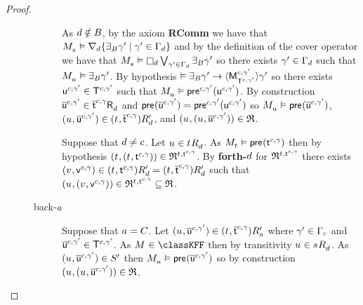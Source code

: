 \begin{proof}
\begin{description}
\begin{description}
                As $\agentD \notin \agentsB$, by the \axiomAamlKFF{} axiom {\bf RComm} we have that $\kPModel{\kStateS} \entails \coversD \{\someactsBs \gamma' \mid \gamma' \in \Gamma_\agentD\}$ and by the definition of the cover operator we have that $\kPModel{\kStateS} \entails \necessaryD \bigvee_{\gamma' \in \Gamma_\agentD} \someactsBs \gamma'$ so there exists $\gamma' \in \Gamma_\agentD$ such that $\kPModel{\kStateU} \entails \someactsBs \gamma'$.
                By hypothesis $\entails \someactsBs \gamma' \implies \actionE{\aPModel[\agentC, \gamma']{\aStatesT[\agentC, \gamma']}} \gamma'$ so there exists $\aStateU[\agentC, \gamma'] \in \aStatesT[\agentC, \gamma']$ such that $\kPModel{\kStateU} \entails \aPrecondition[\agentC, \gamma'](\aStateU[\agentC, \gamma'])$.
                By construction $\aPStateU[\agentC, \gamma'] \in \aSuccessorsD{\aPStateT[\agentC, \gamma]}$ and $\aPrecondition(\aPStateU[\agentC, \gamma']) = \aPrecondition[\agentC, \gamma'](\aStateU[\agentC, \gamma'])$ so $\kPModel{\kStateU} \entails \aPrecondition(\aPStateU[\agentC, \gamma'])$, $(\kStateU, \aPStateU[\agentC, \gamma']) \in \kSuccessorsPD{(\kStateT, \aPStateT[\agentC, \gamma])}$, and $(\kStateU, (\kStateU, \aPStateU[\agentC, \gamma'])) \in \refinement$.

                Suppose that $\agentD \neq \agentC$.
                Let $\kStateU \in \kSuccessorsD{\kStateT}$.
                As $\kPModel{\kStateT} \entails \aPrecondition(\aStateT[\agentC, \gamma])$ then by hypothesis $(\kStateT, (\kStateT, \aStateT[\agentC, \gamma])) \in \refinement^{\kStateT, \aStateT[\agentC, \gamma]}$.
                By {\bf forth-$\agentD$} for $\refinement^{\kStateT, \aStateT[\agentC, \gamma]}$ there exists $(\kStateV, \aStateV[\agentC, \gamma]) \in \kSuccessorsPD{(\kStateT, \aStateT[\agentC, \gamma])} = \kSuccessorsPD{(\kStateT, \aPStateT[\agentC, \gamma])}$ such that $(\kStateU, (\kStateV, \aStateV[\agentC, \gamma])) \in \refinement^{\kStateT, \aStateT[\agentC, \gamma]} \subseteq \refinement$.
            \item[back-$\agentA$]
                Suppose that $\agentA = \agentsC$.
                Let $(\kStateU, \aPStateU[\agentC, \gamma']) \in \kSuccessorsPA{(\kStateT, \aPStateT[\agentC, \gamma])}$ where $\gamma' \in \Gamma_\agentC$ and $\aPStateU[\agentC, \gamma'] \in \aStatesT[\agentC, \gamma']$.
                As $\kModel \in \classKFF$ then by transitivity $\kStateU \in \kSuccessorsD{\kStateS}$.
                As $(\kStateU, \aPStateU[\agentC, \gamma']) \in \kStatesP$ then $\kPModel{\kStateU} \entails \aPrecondition(\aPStateU[\agentC, \gamma'])$ so by construction $(\kStateU, (\kStateU, \aPStateU[\agentC, \gamma'])) \in \refinement$.


\end{description}
\end{description}
\end{proof}
